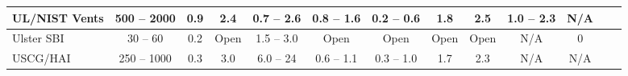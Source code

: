\begin{table}
\begin{center}
\begin{tabular}{|l|c|c|c|c|c|c|c|c|c|c|c|c|}
UL/NIST Vents       & 500 -- 2000   & 0.9           & 2.4   & 0.7 -- 2.6        & 0.8 -- 1.6          & 0.2 -- 0.6    & 1.8         & 2.5         & 1.0 -- 2.3            & N/A                   \\ \hline
Ulster SBI          & 30 -- 60      & 0.2           & Open  & 1.5 -- 3.0        & Open                & Open          & Open        & Open        & N/A                   & 0                     \\ \hline
USCG/HAI            & 250 -- 1000   & 0.3           & 3.0   & 6.0 -- 24         & 0.6 -- 1.1          & 0.3 -- 1.0    & 1.7         & 2.3         & N/A                   & N/A                   \\ \hline

\end{tabular}
\end{center}
\label{Test_Parameters}
\end{table}


\newpage

